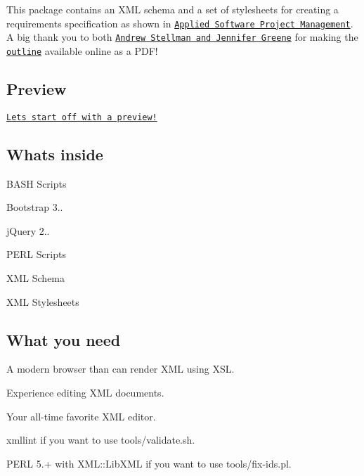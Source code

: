 This package contains an X\+ML schema and a set of stylesheets for creating a requirements specification as shown in \href{http://www.stellman-greene.com/about/applied-software-project-management/}{\tt Applied Software Project Management}. A big thank you to both \href{http://www.stellman-greene.com/}{\tt Andrew Stellman and Jennifer Greene} for making the \href{http://www.stellman-greene.com/images/stories/Library/SRS%20Outline.pdf}{\tt outline} available online as a P\+D\+F!

\subsection*{Preview }

\href{https://cdn.rawgit.com/kherge/srs/f4f857aadfae8c47b9491c80ca875a216e142e3f/example.xml}{\tt Let\textquotesingle{}s start off with a preview!}

\subsection*{What\textquotesingle{}s inside }


\begin{DoxyItemize}
\item B\+A\+SH Scripts
\item Bootstrap 3..
\item j\+Query 2..
\item P\+E\+RL Scripts
\item X\+ML Schema
\item X\+ML Stylesheets
\end{DoxyItemize}

\subsection*{What you need }


\begin{DoxyItemize}
\item A modern browser than can render X\+ML using X\+SL.
\item Experience editing X\+ML documents.
\item Your all-\/time favorite X\+ML editor.
\item {\ttfamily xmllint} if you want to use {\ttfamily tools/validate.\+sh}.
\item P\+E\+RL 5.+ with {\ttfamily X\+M\+L\+::\+Lib\+X\+ML} if you want to use {\ttfamily tools/fix-\/ids.\+pl}.
\end{DoxyItemize}

